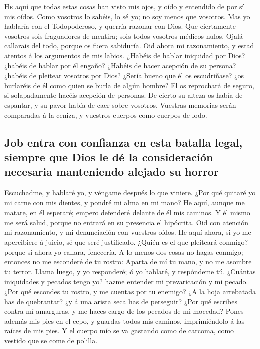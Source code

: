  \textsc{He} aquí que todas estas cosas han visto mis
ojos, y oído y entendido de por sí mis oídos.  Como
vosotros lo sabéis, lo sé yo; no soy menos que vosotros. 
Mas yo hablaría con el Todopoderoso, y querría razonar con Dios.
 Que ciertamente vosotros sois fraguadores de mentira;
sois todos vosotros médicos nulos.  Ojalá callarais del
todo, porque os fuera sabiduría.  Oid ahora mi
razonamiento, y estad atentos á los argumentos de mis labios.
 ¿Habéis de hablar iniquidad por Dios? ¿habéis de hablar
por él engaño?  ¿Habéis de hacer acepción de su persona?
¿habéis de pleitear vosotros por Dios?  ¿Sería bueno que
él os escudriñase? ¿os burlaréis de él como quien se burla de algún
hombre?  El os reprochará de seguro, si solapadamente
hacéis acepción de personas.  De cierto su alteza os
había de espantar, y su pavor había de caer sobre vosotros.
 Vuestras memorias serán comparadas á la ceniza, y
vuestros cuerpos como cuerpos de lodo.

\hypertarget{job-entra-con-confianza-en-esta-batalla-legal-siempre-que-dios-le-duxe9-la-consideraciuxf3n-necesaria-manteniendo-alejado-su-horror}{%
\subsection{Job entra con confianza en esta batalla legal, siempre que
Dios le dé la consideración necesaria manteniendo alejado su
horror}\label{job-entra-con-confianza-en-esta-batalla-legal-siempre-que-dios-le-duxe9-la-consideraciuxf3n-necesaria-manteniendo-alejado-su-horror}}

 Escuchadme, y hablaré yo, y véngame después lo que
viniere.  ¿Por qué quitaré yo mi carne con mis dientes, y
pondré mi alma en mi mano?  He aquí, aunque me matare, en
él esperaré; empero defenderé delante de él mis caminos. 
Y él mismo me será salud, porque no entrará en su presencia el
hipócrita.  Oid con atención mi razonamiento, y mi
denunciación con vuestros oídos.  He aquí ahora, si yo me
apercibiere á juicio, sé que seré justificado.  ¿Quién es
el que pleiteará conmigo? porque si ahora yo callara, fenecería.
 A lo menos dos cosas no hagas conmigo; entonces no me
esconderé de tu rostro:  Aparta de mí tu mano, y no me
asombre tu terror.  Llama luego, y yo responderé; ó yo
hablaré, y respóndeme tú.  ¿Cuántas iniquidades y pecados
tengo yo? hazme entender mi prevaricación y mi pecado. 
¿Por qué escondes tu rostro, y me cuentas por tu enemigo?
 ¿A la hoja arrebatada has de quebrantar? ¿y á una arista
seca has de perseguir?  ¿Por qué escribes contra mí
amarguras, y me haces cargo de los pecados de mi mocedad?
 Pones además mis pies en el cepo, y guardas todos mis
caminos, imprimiéndolo á las raíces de mis pies.  Y el
cuerpo mío se va gastando como de carcoma, como vestido que se come de
polilla.

